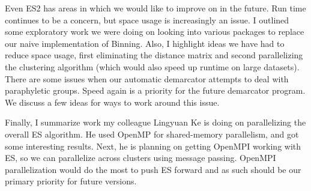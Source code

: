 Even ES2 has areas in which we would like to improve on in the future.
Run time continues to be a concern, but space usage is increasingly an issue.
I outlined some exploratory work we were doing on looking into various packages to replace our naive implementation of Binning.
Also, I highlight ideas we have had to reduce space usage, first eliminating the distance matrix and second parallelizing the clustering algorithm (which would also speed up runtime on large datasets).
There are some issues when our automatic demarcator attempts to deal with paraphyletic groups.
Speed again is a priority for the future demarcator program.
We discuss a few ideas for ways to work around this issue.

Finally, I summarize work my colleague Lingyuan Ke is doing on parallelizing the overall ES algorithm.
He used OpenMP for shared-memory parallelism, and got some interesting results.
Next, he is planning on getting OpenMPI working with ES, so we can parallelize across clusters using message passing.
OpenMPI parallelization would do the most to push ES forward and as such should be our primary priority for future versions.

